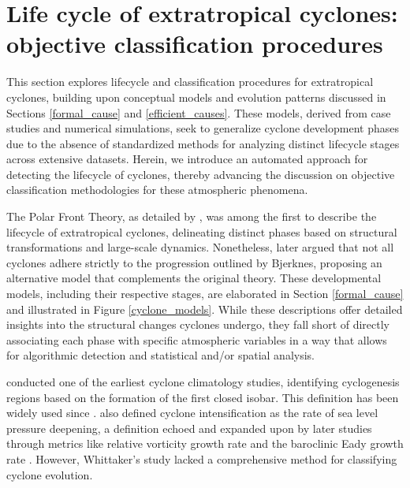 \section{Life cycle of extratropical cyclones: objective classification procedures}

This section explores lifecycle and classification procedures for extratropical cyclones, building upon conceptual models and evolution patterns discussed in Sections \ref{formal_cause} and \ref{efficient_causes}. These models, derived from case studies and numerical simulations, seek to generalize cyclone development phases due to the absence of standardized methods for analyzing distinct lifecycle stages across extensive datasets. Herein, we introduce an automated approach for detecting the lifecycle of cyclones, thereby advancing the discussion on objective classification methodologies for these atmospheric phenomena.

The Polar Front Theory, as detailed by \citet{bjerknes1922life}, was among the first to describe the lifecycle of extratropical cyclones, delineating distinct phases based on structural transformations and large-scale dynamics. Nonetheless, \citet{shapiro1990fronts} later argued that not all cyclones adhere strictly to the progression outlined by Bjerknes, proposing an alternative model that complements the original theory. These developmental models, including their respective stages, are elaborated in Section \ref{formal_cause} and illustrated in Figure \ref{cyclone_models}. While these descriptions offer detailed insights into the structural changes cyclones undergo, they fall short of directly associating each phase with specific atmospheric variables in a way that allows for algorithmic detection and statistical and/or spatial analysis.

\citet{whittaker1984northern} conducted one of the earliest cyclone climatology studies, identifying cyclogenesis regions based on the formation of the first closed isobar. This definition has been widely used since \citep[e.g]{gramcianinov2019properties,trigo2006climatology,hoskins2005new,simmonds2000mean}. \citet{whittaker1984northern} also defined cyclone intensification as the rate of sea level pressure deepening, a definition echoed and expanded upon by later studies through metrics like relative vorticity growth rate \citep{grise2013intraseasonal,gramcianinov2019properties,hoskins2005new} and the baroclinic Eady growth rate \citep{pinto2005sensitivities}. However, Whittaker's study lacked a comprehensive method for classifying cyclone evolution.


